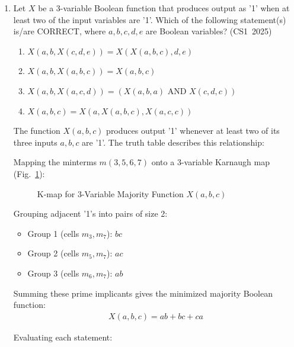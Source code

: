 \begin{enumerate}[label=\thesubsection.\arabic*, ref=\thesubsection.\theenumi]
\vspace{0.5cm}
\item Let $X$ be a 3-variable Boolean function that produces output as '1' when at least two of the input variables are '1'. Which of the following statement(s) is/are CORRECT, where $a, b, c, d, e$ are Boolean variables?
\hfill (CS1~2025)
\begin{enumerate}
    \item $X(a,b,X(c,d,e)) = X(X(a,b,c),d,e)$
    \item $X(a,b,X(a,b,c)) = X(a,b,c)$
    \item $X(a,b,X(a,c,d)) = (X(a,b,a) \text{ AND } X(c,d,c))$
    \item $X(a,b,c) = X(a, X(a,b,c), X(a,c,c))$
\end{enumerate}

\vspace{0.2cm}
\solution
The function $X(a,b,c)$ produces output '1' whenever at least two of its three inputs $a, b, c$ are '1'. The truth table describes this relationship:

\begin{center}

\end{center}

Mapping the minterms $m(3, 5, 6, 7)$ onto a 3-variable Karnaugh map (Fig.~\ref{fig:q7_kmap}):

\begin{figure}[H]
    \centering
    
    \caption{K-map for 3-Variable Majority Function $X(a,b,c)$}
    \label{fig:q7_kmap}
\end{figure}

Grouping adjacent '1's into pairs of size 2:
\begin{itemize}
    \item Group 1 (cells $m_3, m_7$): $bc$
    \item Group 2 (cells $m_5, m_7$): $ac$
    \item Group 3 (cells $m_6, m_7$): $ab$
\end{itemize}
Summing these prime implicants gives the minimized majority Boolean function:
\begin{align}
X(a,b,c) = ab + bc + ca
\end{align}

Evaluating each statement:


\end{enumerate}
